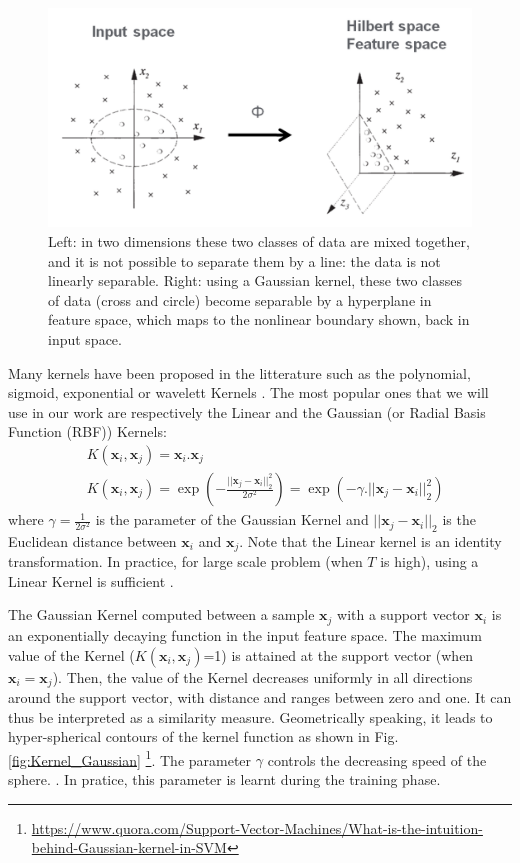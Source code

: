 \begin{figure}[h!]
\centering
\includegraphics[width=0.9\linewidth]{images/SVM_nonlinear}
\caption{Left: in two dimensions these two classes of data are mixed together, and it is not possible to separate them by a line: the data is not linearly separable. Right: using a Gaussian kernel, these two classes of data (cross and circle) become separable by a hyperplane in feature space, which maps to the nonlinear boundary shown, back in input space.}
\label{fig:SVM_nonlinear}
\end{figure}

Many kernels have been proposed in the litterature such as the polynomial, sigmoid, exponential or wavelett Kernels \cite{Schlkopf2013}. The most popular ones that we will use in our work are respectively the Linear and the Gaussian (or Radial Basis Function (RBF)) Kernels:
\begin{align}
	& K(\textbf{x}_i,\textbf{x}_j)= \textbf{x}_i . \textbf{x}_j \\
	& K(\textbf{x}_i,\textbf{x}_j)
	= \exp(-\frac{||\textbf{x}_j-\textbf{x}_i||_2^2}{2\sigma^2})
	= \exp(-\gamma.||\textbf{x}_j-\textbf{x}_i||_2^2)
\end{align}
where $\gamma = \frac{1}{2\sigma^2}$ is the parameter of the Gaussian Kernel and $||\textbf{x}_j-\textbf{x}_i||_2$ is the Euclidean distance between $\textbf{x}_i$ and $\textbf{x}_j$. Note that the Linear kernel is an identity transformation. In practice, for large scale problem (when $T$ is high), using a Linear Kernel is sufficient  \cite{Fan2008}.

The Gaussian Kernel computed between a sample $\textbf{x}_j$ with a support vector $\textbf{x}_i$ is an exponentially decaying function in the input feature space. The maximum value of the Kernel ($K(\textbf{x}_i,\textbf{x}_j)$=1) is attained at the support vector (when $\textbf{x}_i=\textbf{x}_j$). Then, the value of the Kernel decreases uniformly in all directions around the support vector, with distance and ranges between zero and one. It can thus be interpreted as a similarity measure. Geometrically speaking, it leads to hyper-spherical contours of the kernel function as shown in Fig. \ref{fig:Kernel_Gaussian} \footnote{\url{https://www.quora.com/Support-Vector-Machines/What-is-the-intuition-behind-Gaussian-kernel-in-SVM}}. The parameter $\gamma$ controls the decreasing speed of the sphere. . In pratice, this parameter is learnt during the training phase.


